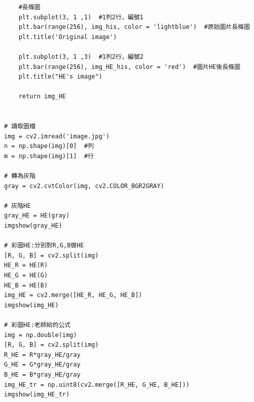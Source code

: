\documentclass[12pt,a4paper]{article}
\begin{document}
\begin{enumerate}
\begin{lstlisting}
    #長條圖
    plt.subplot(3, 1 ,1)  #1列2行，編號1
    plt.bar(range(256), img_his, color = 'lightblue')  #原始圖片長條圖
    plt.title('Original image')
    
    plt.subplot(3, 1 ,3)  #1列2行，編號2
    plt.bar(range(256), img_HE_his, color = 'red')  #圖片HE後長條圖
    plt.title("HE's image")
    
    return img_HE


# 讀取圖檔
img = cv2.imread('image.jpg')
n = np.shape(img)[0]  #列
m = np.shape(img)[1]  #行

# 轉為灰階
gray = cv2.cvtColor(img, cv2.COLOR_BGR2GRAY)

# 灰階HE
gray_HE = HE(gray)
imgshow(gray_HE)

# 彩圖HE:分別對R,G,B做HE
[R, G, B] = cv2.split(img)
HE_R = HE(R)
HE_G = HE(G)
HE_B = HE(B)
img_HE = cv2.merge([HE_R, HE_G, HE_B])
imgshow(img_HE)

# 彩圖HE:老師給的公式
img = np.double(img)
[R, G, B] = cv2.split(img)
R_HE = R*gray_HE/gray
G_HE = G*gray_HE/gray
B_HE = B*gray_HE/gray
img_HE_tr = np.uint8(cv2.merge([R_HE, G_HE, B_HE]))
imgshow(img_HE_tr)


\end{lstlisting}


\end{enumerate}
\end{document}
